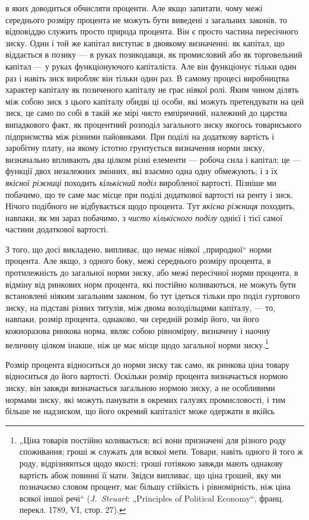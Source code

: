 \parcont{}  %
в яких доводиться обчисляти проценти. Але якщо запитати, чому
межі середнього розміру процента не можуть бути виведені
з загальних законів, то відповіддю служить просто природа процента.
Він є просто частина пересічного зиску. Один і той же
капітал виступає в двоякому визначенні: як капітал, що віддається
в позику — в руках позикодавця, як промисловий або як
торговельний капітал — у руках функціонуючого капіталіста. Але
він функціонує тільки один раз і навіть зиск виробляє він тільки
один раз. В самому процесі виробництва характер капіталу як
позиченого капіталу не грає ніякої ролі. Яким чином ділять
між собою зиск з цього капіталу обидві ці особи, які можуть
претендувати на цей зиск, це само по собі в такій же мірі чисто
емпіричний, належний до царства випадкового факт, як процентний
розподіл загального зиску якогось товариського підприємства
між різними пайовиками. При поділі на додаткову вартість
і заробітну плату, на якому істотно грунтується визначення
норми зиску, визначально впливають два цілком різні елементи —
робоча сила і капітал; це — функції двох незалежних змінних, які
взаємно одна одну обмежують; і з їх \emph{якісної ріжниці} походить
\emph{кількісний поділ }виробленої вартості. Пізніше ми побачимо, що
те саме має місце при поділі додаткової вартості на ренту і зиск.
Нічого подібного не відбувається щодо процента. Тут \emph{якісна}
\emph{ріжниця} походить, навпаки, як ми зараз побачимо, з \emph{чисто кількісного
поділу} однієї і тієї самої частини додаткової вартості.

З того, що досі викладено, випливає, що немає ніякої „природної“
норми процента. Але якщо, з одного боку, межі середнього
розміру процента, в протилежність до загальної норми зиску,
або межі пересічної норми процента, в відміну від ринкових
норм процента, які постійно коливаються, не можуть бути встановлені
ніяким загальним законом, бо тут ідеться тільки про
поділ гуртового зиску, на підставі різних титулів, між двома володільцями
капіталу, — то, навпаки, розмір процента, однаково,
чи середній розмір його, чи його кожноразова ринкова норма,
являє собою рівномірну, визначену і наочну величину цілком
інакше, ніж це має місце щодо загальної норми зиску.\footnote{
„Ціна товарів постійно коливається; всі вони призначені для різного роду
споживання; гроші ж служать для всякої мети. Товари, навіть одного й того ж
роду, відрізняються щодо якості; гроші готівкою завжди мають однакову вартість
абож повинні її мати. Звідси випливає, що ціна грошей, яку ми позначаємо
словом процент, має більшу стійкість і рівномірність, ніж ціна всякої
іншої речі“ (\emph{J.~Steuart}: „Principles of Political Economy“, франц. перекл. 1789,
VI, стор. 27).
}

Розмір процента відноситься до норми зиску так само, як ринкова
ціна товару відноситься до його вартості. Оскільки розмір
процента визначається нормою зиску, він завжди визначається
загальною нормою зиску, а не особливими нормами зиску, які
можуть панувати в окремих галузях промисловості, і тим більше
не надзиском, що його окремий капіталіст може одержати в якійсь
\parbreak{}  %
